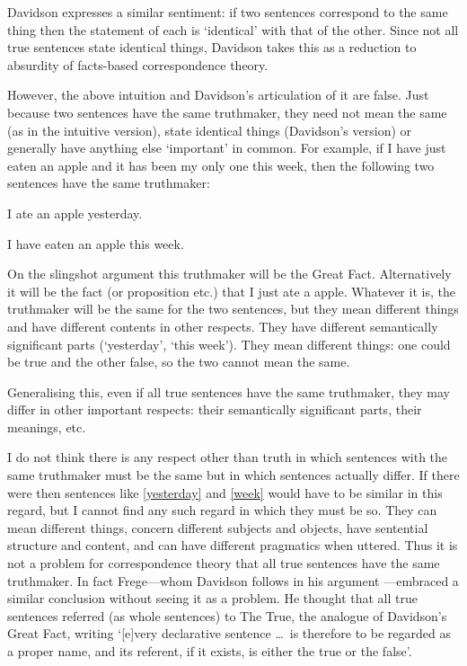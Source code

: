 Davidson expresses a similar sentiment: if two sentences correspond to the same thing then the statement of each is `identical' with that of the other.
Since not all true sentences state identical things, Davidson takes this as a reduction to absurdity of facts-based correspondence theory.
\parencite[750]{Davidson_1969}

However, the above intuition and Davidson's articulation of it are false.
Just because two sentences have the same truthmaker, they need not mean the same (as in the intuitive version), state identical things (Davidson's version) or generally have anything else `important' in common.
For example, if I have just eaten an apple and it has been my only one this week, then the following two sentences have the same truthmaker:

	\begin{example}\label{yesterday}
	I ate an apple yesterday.
	\end{example}

	\begin{example}\label{week}
	I have eaten an apple this week.
	\end{example}

On the slingshot argument this truthmaker will be the Great Fact.
Alternatively it will be the fact (or proposition etc.) that I just ate a apple.
Whatever it is, the truthmaker will be the same for the two sentences, but they mean different things and have different contents in other respects.
They have different semantically significant parts (`yesterday', `this week').
They mean different things: one could be true and the other false, so the two cannot mean the same.

Generalising this, even if all true sentences have the same truthmaker, they may differ in other important respects: their semantically significant parts, their meanings, etc.

I do not think there is any respect other than truth in which sentences with the same truthmaker must be the same but in which sentences actually differ. 
If there were then sentences like \ref{yesterday} and \ref{week} would have to be similar in this regard, but I cannot find any such regard in which they must be so.
They can mean different things, concern different subjects and objects, have sentential structure and content, and can have different pragmatics when uttered.
Thus it is not a problem for correspondence theory that all true sentences have the same truthmaker.
In fact Frege---whom Davidson follows in his argument \parencite[750]{Davidson_1969}---embraced a similar conclusion without seeing it as a problem.
He thought that all true sentences referred (as whole sentences) to The True, the analogue of Davidson's Great Fact, writing `[e]very declarative sentence \ldots\ is therefore to be regarded as a proper name, and its referent, if it exists, is either the true or the false'.
\parencite[216]{Frege_1948}

